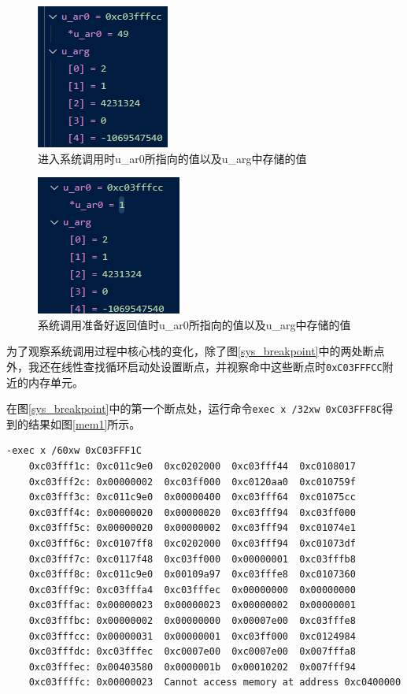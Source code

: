 \begin{figure}[!htbp]
    \centering
    \includegraphics[scale=1]{images/enter.png}
    \caption{进入系统调用时u\_ar0所指向的值以及u\_arg中存储的值}\label{enter}
\end{figure}

\begin{figure}[!htbp]
    \centering
    \includegraphics[scale=1]{images/return.png}
    \caption{系统调用准备好返回值时u\_ar0所指向的值以及u\_arg中存储的值}\label{return}
\end{figure}

为了观察系统调用过程中核心栈的变化，除了图\ref{sys_breakpoint}中的两处断点外，我还在线性查找循环启动处设置断点，并视察命中这些断点时\texttt{0xC03FFFCC}附近的内存单元。

在图\ref{sys_breakpoint}中的第一个断点处，运行命令\texttt{exec x /32xw 0xC03FFF8C}得到的结果如图\ref{mem1}所示。

\newpage

\begin{Verbatim}[frame=single,fontsize=\small]
    -exec x /60xw 0xC03FFF1C
    0xc03fff1c:	0xc011c9e0	0xc0202000	0xc03fff44	0xc0108017
    0xc03fff2c:	0x00000002	0xc03ff000	0xc0120aa0	0xc010759f
    0xc03fff3c:	0xc011c9e0	0x00000400	0xc03fff64	0xc01075cc
    0xc03fff4c:	0x00000020	0x00000020	0xc03fff94	0xc03ff000
    0xc03fff5c:	0x00000020	0x00000002	0xc03fff94	0xc01074e1
    0xc03fff6c:	0xc0107ff8	0xc0202000	0xc03fff94	0xc01073df
    0xc03fff7c:	0xc0117f48	0xc03ff000	0x00000001	0xc03fffb8
    0xc03fff8c:	0xc011c9e0	0x00109a97	0xc03fffe8	0xc0107360
    0xc03fff9c:	0xc03fffa4	0xc03fffec	0x00000000	0x00000000
    0xc03fffac:	0x00000023	0x00000023	0x00000002	0x00000001
    0xc03fffbc:	0x00000002	0x00000000	0x00007e00	0xc03fffe8
    0xc03fffcc:	0x00000031	0x00000001	0xc03ff000	0xc0124984
    0xc03fffdc:	0xc03fffec	0xc0007e00	0xc0007e00	0x007fffa8
    0xc03fffec:	0x00403580	0x0000001b	0x00010202	0x007fff94
    0xc03ffffc:	0x00000023	Cannot access memory at address 0xc0400000
\end{Verbatim}
\label{mem1}


